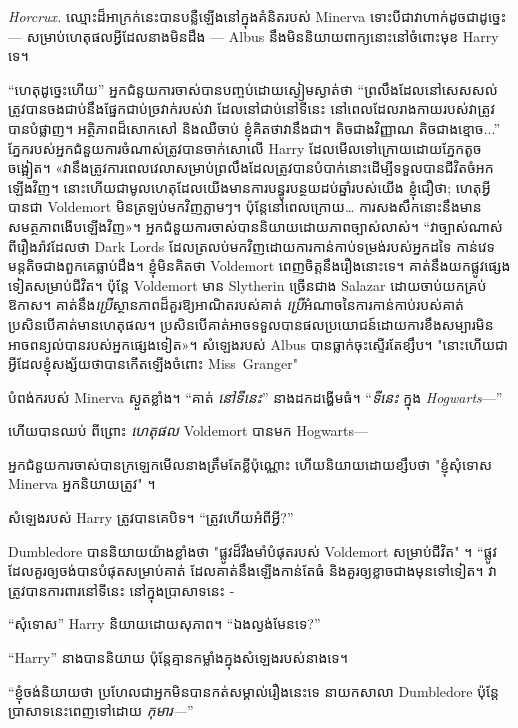 {{\emph{Horcrux.} ឈ្មោះដ៏អាក្រក់នេះបានបន្លឺឡើងនៅក្នុងគំនិតរបស់ Minerva ទោះបីជាវាហាក់ដូចជាដូច្នេះ — សម្រាប់ហេតុផលអ្វីដែលនាងមិនដឹង — Albus នឹងមិននិយាយពាក្យនោះនៅចំពោះមុខ Harry ទេ។

“ហេតុដូច្នេះហើយ” អ្នកជំនួយការចាស់បានបញ្ចប់ដោយស្ងៀមស្ងាត់ថា “ព្រលឹងដែលនៅសេសសល់ត្រូវបានចងជាប់នឹងផ្នែកជាប់ច្រវាក់របស់វា ដែលនៅជាប់នៅទីនេះ នៅពេលដែលរាងកាយរបស់វាត្រូវបានបំផ្លាញ។ អត្ថិភាពដ៏សោកសៅ និងឈឺចាប់ ខ្ញុំគិតថាវានឹងជា។ តិចជាងវិញ្ញាណ តិចជាងខ្មោច...” ភ្នែករបស់អ្នកជំនួយការចំណាស់ត្រូវបានចាក់សោលើ Harry ដែលមើលទៅក្រោយដោយភ្នែកតូចចង្អៀត។ «វា​នឹង​ត្រូវការ​ពេល​វេលា​សម្រាប់​ព្រលឹង​ដែល​ត្រូវ​បាន​បំបាក់​នោះ​ដើម្បី​ទទួល​បាន​ជីវិត​ចំអក​ឡើង​វិញ។ នោះហើយជាមូលហេតុដែលយើងមានការបន្ធូរបន្ថយដប់ឆ្នាំរបស់យើង ខ្ញុំជឿថា; ហេតុអ្វីបានជា Voldemort មិនត្រឡប់មកវិញភ្លាមៗ។ ប៉ុន្តែ​នៅ​ពេល​ក្រោយ… ការ​សងសឹក​នោះ​នឹង​មាន​សមត្ថភាព​ងើប​ឡើង​វិញ»។ អ្នកជំនួយការចាស់បាននិយាយដោយភាពច្បាស់លាស់។ “វាច្បាស់ណាស់ពីរឿងរ៉ាវដែលថា Dark Lords ដែលត្រលប់មកវិញដោយការកាន់កាប់ទម្រង់របស់អ្នកដទៃ កាន់វេទមន្តតិចជាងពួកគេធ្លាប់ដឹង។ ខ្ញុំមិនគិតថា Voldemort ពេញចិត្តនឹងរឿងនោះទេ។ គាត់នឹងយកផ្លូវផ្សេងទៀតសម្រាប់ជីវិត។ ប៉ុន្តែ Voldemort មាន Slytherin ច្រើនជាង Salazar ដោយចាប់យកគ្រប់ឱកាស។ គាត់នឹង\emph{ប្រើ}ស្ថានភាពដ៏គួរឱ្យអាណិតរបស់គាត់ \emph{ប្រើ}អំណាចនៃការកាន់កាប់របស់គាត់ ប្រសិនបើគាត់មានហេតុផល។ ប្រសិនបើ​គាត់​អាច​ទទួល​បាន​ផលប្រយោជន៍​ដោយ​ការ​ខឹងសម្បារ​មិន​អាច​ពន្យល់​បាន​របស់​អ្នក​ផ្សេង​ទៀត»។ សំឡេងរបស់ Albus បានធ្លាក់ចុះស្ទើរតែខ្សឹប។ "នោះហើយជាអ្វីដែលខ្ញុំសង្ស័យថាបានកើតឡើងចំពោះ Miss~Granger"

បំពង់ករបស់ Minerva ស្ងួតខ្លាំង។ “គាត់ \emph{នៅទីនេះ}” នាងដកដង្ហើមធំ។ “\emph{ទីនេះ} ក្នុង \emph{Hogwarts}—”

ហើយបានឈប់ ពីព្រោះ \emph{ហេតុផល} Voldemort បានមក Hogwarts—

អ្នកជំនួយការចាស់បានក្រឡេកមើលនាងត្រឹមតែខ្លីប៉ុណ្ណោះ ហើយនិយាយដោយខ្សឹបថា "ខ្ញុំសុំទោស Minerva អ្នកនិយាយត្រូវ" ។

សំឡេង​របស់ Harry ត្រូវ​បាន​គេ​បិទ។ “ត្រូវហើយអំពីអ្វី?”

Dumbledore បាននិយាយយ៉ាងខ្លាំងថា "ផ្លូវដ៏រឹងមាំបំផុតរបស់ Voldemort សម្រាប់ជីវិត" ។ “ផ្លូវ​ដែល​គួរ​ឲ្យ​ចង់​បាន​បំផុត​សម្រាប់​គាត់ ដែល​គាត់​នឹង​ឡើង​កាន់​តែ​ធំ និង​គួរ​ឲ្យ​ខ្លាច​ជាង​មុន​ទៅ​ទៀត។ វាត្រូវបានការពារនៅទីនេះ នៅក្នុងប្រាសាទនេះ -

“សុំទោស” Harry និយាយដោយសុភាព។ “ឯងល្ងង់មែនទេ?”

“Harry” នាង​បាន​និយាយ ប៉ុន្តែ​គ្មាន​កម្លាំង​ក្នុង​សំឡេង​របស់​នាង​ទេ។

“ខ្ញុំចង់និយាយថា ប្រហែលជាអ្នកមិនបានកត់សម្គាល់រឿងនេះទេ នាយកសាលា Dumbledore ប៉ុន្តែប្រាសាទនេះពេញទៅដោយ \emph{កុមារ—}”

}}
